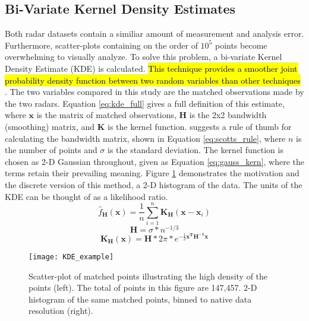 \subsection{Bi-Variate Kernel Density Estimates}
Both radar datasets contain a similiar amount of measurement and analysis error. Furthermore, scatter-plots containing on the order of $10^5$ points become
overwhelming to visually analyze. To solve this problem, a bi-variate Kernel Density Estimate (KDE) is calculated. \hl{This technique provides a smoother 
joint probability density function between two random variables than other techniques} \citep{Silverman1986}. The two variables compared in this study are 
the matched observations made by the two radars. Equation \ref{eq:kde_full} gives a full definition of this estimate, where $\mathbf{x}$ is the matrix of 
matched observations, $\mathbf{H}$ is the 2x2 bandwidth (smoothing) matrix, and $\mathbf{K}$ is the kernel function. \citet{Scott1992} suggests a rule of 
thumb for
calculating the bandwidth matrix, shown in Equation \ref{eq:scotts_rule}, where $n$ is the number of points and $\sigma$ is the standard deviation. The
kernel function is chosen as 2-D Gaussian throughout, given as Equation \ref{eq:gauss_kern}, where the terms retain their prevailing meaning. Figure
\ref{fig:KDE_example} demonstrates the motivation and the discrete version of this method, a 2-D histogram of the data. The units of the KDE can be thought
of as a likelihood ratio.
\\
\begin{equation}\label{eq:kde_full}
\hat{f}_{\mathbf{H}}(\mathbf{x}) = \frac{1}{n} \sum_{i=1}^{n} \mathbf{K_H}(\mathbf{x} - \mathbf{x}_i)
\end{equation}
\begin{equation}\label{eq:scotts_rule}
\mathbf{H} = \sigma * n^{-1/3}
\end{equation}
\begin{equation}\label{eq:gauss_kern}
\mathbf{K_H}(\textbf{x}) = \mathbf{H} * 2\pi * e^{-\frac{1}{2} \mathbf{x^T} \mathbf{H^{-1}} \mathbf{x}}
\end{equation}
\begin{figure}
\texttt{[image: KDE\_example]}\centering
\caption{Scatter-plot of matched points illustrating the high density of the points (left). The total of points in this figure are 147,457. 2-D histogram of
the same matched points, binned to native data resolution (right).} 
\label{fig:KDE_example}
\end{figure}

